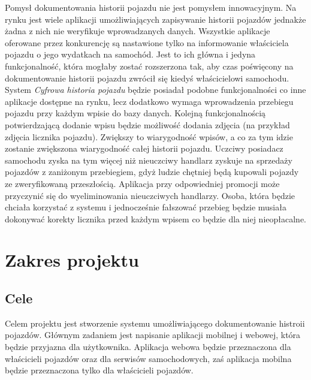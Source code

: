 \documentclass[12pt]{article}
\begin{document}
Pomysł dokumentowania historii pojazdu nie jest pomysłem innowacyjnym. Na rynku jest wiele aplikacji umożliwiających zapisywanie historii pojazdów jednakże żadna z nich nie weryfikuje wprowadzanych danych. Wszystkie aplikacje oferowane przez konkurencję są nastawione tylko na informowanie właściciela pojazdu o jego wydatkach na samochód. Jest to ich główna i jedyna funkcjonalność, która mogłaby zostać rozszerzona tak, aby czas poświęcony na dokumentowanie historii pojazdu zwrócił się kiedyś właścicielowi samochodu.\\

System\textit{ Cyfrowa historia pojazdu} będzie posiadał podobne funkcjonalności co inne aplikacje dostępne na rynku, lecz dodatkowo wymaga wprowadzenia przebiegu pojazdu przy każdym wpisie do bazy danych. Kolejną funkcjonalnością potwierdzającą dodanie wpisu będzie możliwość dodania zdjęcia (na przykład zdjęcia licznika pojazdu). Zwiększy to wiarygodność wpisów, a co za tym idzie zostanie zwiększona wiarygodność całej historii pojazdu. Uczciwy posiadacz samochodu zyska na tym więcej niż nieuczciwy handlarz zyskuje na sprzedaży pojazdów z zaniżonym przebiegiem, gdyż ludzie chętniej będą kupowali pojazdy ze zweryfikowaną przeszłością. Aplikacja przy odpowiedniej promocji może przyczynić się do wyeliminowania nieuczciwych handlarzy. Osoba, która będzie chciała korzystać z systemu i jednocześnie fałszować przebieg będzie musiała dokonywać korekty licznika przed każdym wpisem co będzie dla niej nieopłacalne. 




\newpage
\section{Zakres projektu}
\subsection{Cele}
Celem projektu jest stworzenie systemu umożliwiającego dokumentowanie histroii pojazdów. Głównym zadaniem jest napisanie aplikacji mobilnej i webowej, która będzie przyjazna dla użytkownika. Aplikacja webowa będzie przeznaczona dla właścicieli pojazdów oraz dla serwisów samochodowych, zaś aplikacja mobilna będzie przeznaczona tylko dla właścicieli pojazdów.
\end{document}
